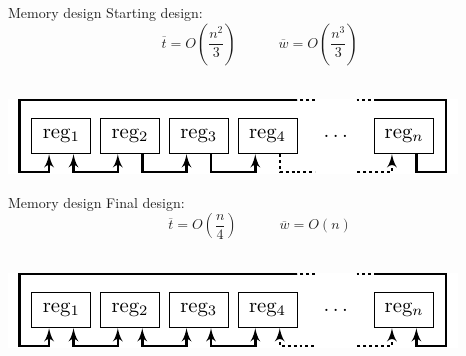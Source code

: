 \documentclass[svgnames]{beamer}
\newenvironment{changemargin}[2]{%
\begin{list}{}{%
\setlength{\topsep}{0pt}%
\setlength{\leftmargin}{#1}%
\setlength{\rightmargin}{#2}%
\setlength{\listparindent}{\parindent}%
\setlength{\itemindent}{\parindent}%
\setlength{\parsep}{\parskip}%
}%
\item[]}{\end{list}}
\begin{document}
\begin{frame}{Memory design}
	Starting design:
	\[\overline{t} = O \left( \frac{n^2}{3} \right) \quad \qquad \overline{w} = O \left( \frac{n^3}{3} \right)\] \\[1.7em]
	
	\begin{changemargin}{-4cm}{-4cm}
		\begin{center}\includegraphics[width=0.8\paperwidth]{images/geheugen-circ}\end{center}
	\end{changemargin}
\end{frame}

\begin{frame}{Memory design}
	Final design:\\[0.3em]
	\[\overline{t} = O \left( \frac{n}{4} \right) \quad \qquad \overline{w} = O \left( n \right)\] \\[1.7em]
	
	\begin{changemargin}{-4cm}{-4cm}
		\begin{center}\includegraphics[width=0.8\paperwidth]{images/geheugen-circ-optimized}\end{center}
	\end{changemargin}
\end{frame}
\end{document}
